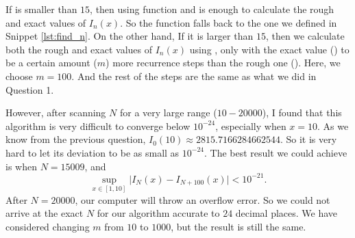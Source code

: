 If  is smaller than $15$, then using function  and
 is enough to calculate the rough and exact values of $I_n(x)$. So the
 function falls back to the one we defined in Snippet \ref{lst:find_n}. On the
other hand, If it is larger than $15$, then we calculate both the rough and exact values of
$I_n(x)$ using , only with the exact value () to
be a certain amount ($m$) more recurrence steps than the rough one (). Here, we
choose $m = 100$.
And the rest of the steps are the same as what we did in Question 1.

However, after scanning $N$ for a very large range ($10 - 20000$), I found that this
algorithm is very difficult to converge below $10^{-24}$, especially when $x = 10$.
As we know from the previous question, $I_0(10) \approx 2815.7166284662544$. So it is
very hard to let its deviation to be as small as $10^{-24}$. The best result we
could achieve is when $N = 15009$, and
%
\begin{equation}
    \sup_{x \in [1, 10]} \lvert I_{N}(x) - I_{N+100}(x) \rvert < 10^{-21}.
\end{equation}
%
After $N = 20000$, our computer will throw an overflow error. So we could not
arrive at the exact $N$ for our algorithm accurate to $24$ decimal places.
We have considered changing $m$ from $10$ to $1000$, but the result is still
the same.

